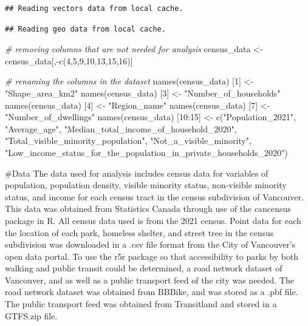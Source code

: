 \documentclass[
]{article}
\newenvironment{Shaded}{\begin{snugshade}}{\end{snugshade}}
\newcommand{\CommentTok}[1]{\textcolor[rgb]{0.56,0.35,0.01}{\textit{#1}}}
\newcommand{\DecValTok}[1]{\textcolor[rgb]{0.00,0.00,0.81}{#1}}
\newcommand{\FunctionTok}[1]{\textcolor[rgb]{0.00,0.00,0.00}{#1}}
\newcommand{\NormalTok}[1]{#1}
\newcommand{\OtherTok}[1]{\textcolor[rgb]{0.56,0.35,0.01}{#1}}
\newcommand{\SpecialCharTok}[1]{\textcolor[rgb]{0.00,0.00,0.00}{#1}}
\newcommand{\StringTok}[1]{\textcolor[rgb]{0.31,0.60,0.02}{#1}}
\begin{document}
\begin{verbatim}
## Reading vectors data from local cache.
\end{verbatim}

\begin{verbatim}
## Reading geo data from local cache.
\end{verbatim}

\begin{Shaded}
\begin{Highlighting}[]
\CommentTok{\# removing columns that are not needed for analysis}
\NormalTok{census\_data }\OtherTok{\textless{}{-}}\NormalTok{ census\_data[,}\SpecialCharTok{{-}}\FunctionTok{c}\NormalTok{(}\DecValTok{4}\NormalTok{,}\DecValTok{5}\NormalTok{,}\DecValTok{9}\NormalTok{,}\DecValTok{10}\NormalTok{,}\DecValTok{13}\NormalTok{,}\DecValTok{15}\NormalTok{,}\DecValTok{16}\NormalTok{)]}
\end{Highlighting}
\end{Shaded}

\begin{Shaded}
\begin{Highlighting}[]
\CommentTok{\# renaming the columns in the dataset}
\FunctionTok{names}\NormalTok{(census\_data) [}\DecValTok{1}\NormalTok{] }\OtherTok{\textless{}{-}} \StringTok{"Shape\_area\_km2"}
\FunctionTok{names}\NormalTok{(census\_data) [}\DecValTok{3}\NormalTok{] }\OtherTok{\textless{}{-}} \StringTok{"Number\_of\_households"}
\FunctionTok{names}\NormalTok{(census\_data) [}\DecValTok{4}\NormalTok{] }\OtherTok{\textless{}{-}} \StringTok{"Region\_name"}
\FunctionTok{names}\NormalTok{(census\_data) [}\DecValTok{7}\NormalTok{] }\OtherTok{\textless{}{-}} \StringTok{"Number\_of\_dwellings"}
\FunctionTok{names}\NormalTok{(census\_data) [}\DecValTok{10}\SpecialCharTok{:}\DecValTok{15}\NormalTok{] }\OtherTok{\textless{}{-}} \FunctionTok{c}\NormalTok{(}\StringTok{"Population\_2021"}\NormalTok{, }\StringTok{"Average\_age"}\NormalTok{, }\StringTok{"Median\_total\_income\_of\_household\_2020"}\NormalTok{, }\StringTok{"Total\_visible\_minority\_population"}\NormalTok{, }\StringTok{"Not\_a\_visible\_minority"}\NormalTok{, }\StringTok{"Low\_income\_status\_for\_the\_population\_in\_private\_households\_2020"}\NormalTok{)}
\end{Highlighting}
\end{Shaded}

\#Data The data used for analysis includes census data for variables of
population, population density, visible minority status, non-visible
minority status, and income for each census tract in the census
subdivision of Vancouver. This data was obtained from Statistics Canada
through use of the cancensus package in R. All census data used is from
the 2021 census. Point data for each the location of each park, homeless
shelter, and street tree in the census subdivision was downloaded in a
.csv file format from the City of Vancouver's open data portal. To use
the r5r package so that accessibility to parks by both walking and
public transit could be determined, a road network dataset of Vancouver,
and as well as a public transport feed of the city was needed. The road
network dataset was obtained from BBBike, and was stored as a .pbf file.
The public transport feed was obtained from Transitland and stored in a
GTFS.zip file.
\end{document}

